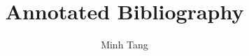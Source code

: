 \documentclass[12pt]{article}
\begin{document}
\title{Annotated Bibliography}
\author{Minh Tang}
\maketitle
\nocite{*}

\end{document}
